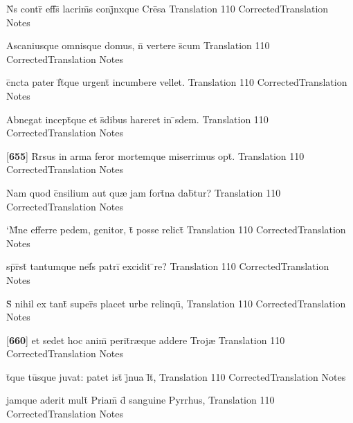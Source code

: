 \latline
  {N\={}s contr\={} eff\={}s\={\macron {\i}} lacrim\={\macron {\i}}s conj\={}nxque Cre\={}sa}
  { Translation }
  {110}
  { CorrectedTranslation }
  { Notes }


\latline
  {Ascaniusque omnisque domus, n\={} vertere s\={}cum}
  { Translation }
  {110}
  { CorrectedTranslation }
  { Notes }


\latline
  {c\={}ncta pater f\={}t\={}que urgent\={\macron {\i}} incumbere vellet.}
  { Translation }
  {110}
  { CorrectedTranslation }
  { Notes }


\latline
  {Abnegat incept\={}que et s\={}dibus hareret in \={\macron {\i}}sdem.}
  { Translation }
  {110}
  { CorrectedTranslation }
  { Notes }


\latline
  {[\textbf{655}] R\={}rsus in arma feror mortemque miserrimus opt\={}.}
  { Translation }
  {110}
  { CorrectedTranslation }
  { Notes }


\latline
  {Nam quod c\={}nsilium aut qu{\ae} jam fort\={}na dab\={}tur?}
  { Translation }
  {110}
  { CorrectedTranslation }
  { Notes }


\latline
  {`M\={}ne efferre pedem, genitor, t\={} posse relict\={}}
  { Translation }
  {110}
  { CorrectedTranslation }
  { Notes }


\latline
  {sp\={}r\={}st\={\macron {\i}} tantumque nef\={}s patri\={} excidit \={}re?}
  { Translation }
  {110}
  { CorrectedTranslation }
  { Notes }


\latline
  {S\={\macron {\i}} nihil ex tant\={} super\={\macron {\i}}s placet urbe relinqu\={\macron {\i}},}
  { Translation }
  {110}
  { CorrectedTranslation }
  { Notes }


\latline
  {[\textbf{660}] et sedet hoc anim\={} perit\={}r{\ae}que addere Troj{\ae}}
  { Translation }
  {110}
  { CorrectedTranslation }
  { Notes }


\latline
  {t\={}que tu\={}sque juvat: patet ist\={\macron {\i}} j\={}nua l\={}t\={},}
  { Translation }
  {110}
  { CorrectedTranslation }
  { Notes }


\latline
  {jamque aderit mult\={} Priam\={\macron {\i}} d\={} sanguine Pyrrhus,}
  { Translation }
  {110}
  { CorrectedTranslation }
  { Notes }


